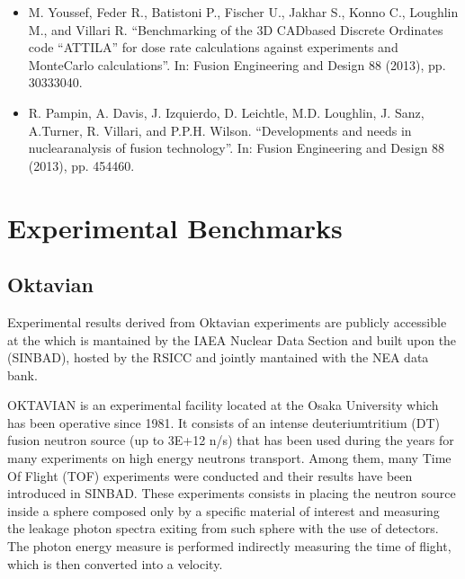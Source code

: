 \documentclass[letterpaper,10pt,english]{sphinxmanual}
\begin{document}


\begin{itemize}
\item {} 
M. Youssef, Feder R., Batistoni P., Fischer U., Jakhar S., Konno C., Lough\sphinxhyphen{}lin M.,
and Villari R. “Benchmarking of the 3\sphinxhyphen{}D CAD\sphinxhyphen{}based Discrete Ordinates code “ATTILA”
for dose rate calculations against experiments and MonteCarlo calculations”.
In: Fusion Engineering and Design 88 (2013), pp. 3033\textendash{}3040.

\item {} 
R. Pampin, A. Davis, J. Izquierdo, D. Leichtle, M.D. Loughlin, J. Sanz, A.Turner,
R. Villari, and P.P.H. Wilson. “Developments and needs in nuclearanalysis of
fusion technology”. In: Fusion Engineering and Design 88 (2013), pp. 454\textendash{}460.

\end{itemize}




\section{Experimental Benchmarks}
\label{\detokenize{usage/benchmarks:experimental-benchmarks}}

\subsection{Oktavian}
\label{\detokenize{usage/benchmarks:oktavian}}
Experimental results derived from Oktavian experiments are publicly accessible at the
 which is mantained by the
IAEA Nuclear Data Section and built upon the
 (SINBAD), hosted
by the RSICC and jointly mantained with the NEA data bank.

OKTAVIAN is an experimental facility located at the Osaka University which has been
operative since 1981. It consists of an intense deuterium\sphinxhyphen{}tritium (D\sphinxhyphen{}T) fusion
neutron source (up to 3E+12 n/s) that has been used during the years for
many experiments on high energy neutrons transport. Among them, many Time Of Flight
(TOF) experiments were conducted and their results have been
introduced in SINBAD. These experiments consists in placing the neutron source inside
a sphere composed only by a specific material of interest and measuring the leakage
photon spectra exiting from such sphere with the use of detectors. The photon energy
measure is performed indirectly measuring the time of flight, which is then converted
into a velocity.
\end{document}
